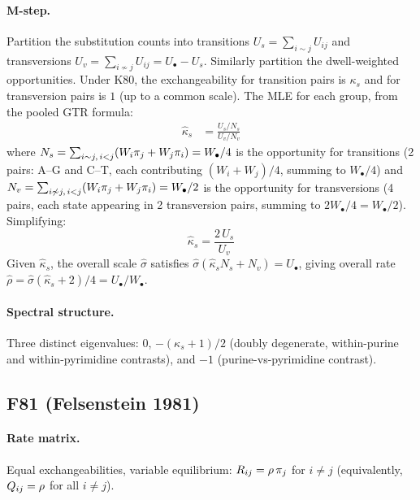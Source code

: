 \paragraph{M-step.}
Partition the substitution counts into transitions $U_s = \sum_{i \sim j} U_{ij}$
and transversions $U_v = \sum_{i \not\sim j} U_{ij} = U_\bullet - U_s$.
Similarly partition the dwell-weighted opportunities.
Under K80, the exchangeability for transition pairs is $\kappa_s$
and for transversion pairs is $1$ (up to a common scale).
The MLE for each group, from the pooled GTR formula:
\begin{align}
\hat{\kappa}_s &= \frac{U_s / N_s}{U_v / N_v}
\label{eq:k80-kappa}
\end{align}
where
$N_s = \sum_{i \sim j, \, i<j} (W_i \pi_j + W_j \pi_i)
     = W_\bullet / 4$
is the opportunity for transitions
(2 pairs: A--G and C--T, each contributing $(W_i+W_j)/4$,
summing to $W_\bullet/4$) and
$N_v = \sum_{i \not\sim j, \, i<j} (W_i \pi_j + W_j \pi_i)
     = W_\bullet / 2$
is the opportunity for transversions
(4 pairs, each state appearing in 2 transversion pairs,
summing to $2W_\bullet/4 = W_\bullet/2$).
Simplifying:
\begin{equation}
\label{eq:k80-mstep}
\hat{\kappa}_s = \frac{2\, U_s}{U_v}
\end{equation}
Given $\hat{\kappa}_s$, the overall scale $\hat\sigma$ satisfies
$\hat\sigma(\hat\kappa_s N_s + N_v) = U_\bullet$,
giving overall rate
$\hat\rho = \hat\sigma(\hat\kappa_s + 2)/4 = U_\bullet / W_\bullet$.

\paragraph{Spectral structure.}
Three distinct eigenvalues: $0$, $-(\kappa_s + 1)/2$ (doubly degenerate,
within-purine and within-pyrimidine contrasts), and $-1$
(purine-vs-pyrimidine contrast).


\subsection{F81 (Felsenstein 1981)}
\label{sec:mstep-f81}

\paragraph{Rate matrix.}
Equal exchangeabilities, variable equilibrium:
$R_{ij} = \rho\, \pi_j$ for $i \neq j$
(equivalently, $Q_{ij} = \rho$ for all $i \neq j$).

